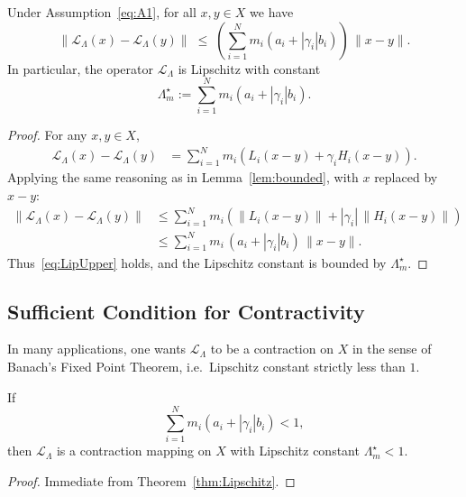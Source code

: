 \documentclass[11pt]{article}
\begin{document}
\begin{theorem}\label{thm:Lipschitz}
Under Assumption~\eqref{eq:A1}, for all $x,y\in X$ we have
\begin{equation}
  \|\mathcal{L}_\Lambda(x) - \mathcal{L}_\Lambda(y)\|
  \;\le\;
  \left(\sum_{i=1}^N m_i (a_i + |\gamma_i| b_i)\right)\,\|x-y\|.
  \label{eq:LipUpper}
\end{equation}
In particular, the operator $\mathcal{L}_\Lambda$ is Lipschitz with constant
\[
  \Lambda_m^\star := \sum_{i=1}^N m_i (a_i + |\gamma_i| b_i).
\]
\end{theorem}

\begin{proof}
For any $x,y\in X$,
\begin{align*}
  \mathcal{L}_\Lambda(x)-\mathcal{L}_\Lambda(y)
  &= \sum_{i=1}^N m_i \left( L_i(x-y) + \gamma_i H_i(x-y) \right).
\end{align*}
Applying the same reasoning as in Lemma~\ref{lem:bounded}, with $x$ replaced by $x-y$:
\begin{align*}
  \|\mathcal{L}_\Lambda(x)-\mathcal{L}_\Lambda(y)\|
  &\le \sum_{i=1}^N m_i \left(\|L_i(x-y)\| + |\gamma_i| \,\|H_i(x-y)\| \right)\\
  &\le \sum_{i=1}^N m_i\,(a_i + |\gamma_i|b_i)\,\|x-y\|.
\end{align*}
Thus~\eqref{eq:LipUpper} holds, and the Lipschitz constant is bounded by $\Lambda_m^\star$.
\end{proof}

\subsection{Sufficient Condition for Contractivity}

In many applications, one wants $\mathcal{L}_\Lambda$ to be a contraction on $X$ in the sense of Banach's Fixed Point Theorem, i.e.\ Lipschitz constant strictly less than $1$.

\begin{corollary}\label{cor:contractive}
If
\begin{equation}
  \sum_{i=1}^N m_i (a_i + |\gamma_i|b_i) < 1,
  \label{eq:contract}
\end{equation}
then $\mathcal{L}_\Lambda$ is a contraction mapping on $X$ with Lipschitz constant
$\Lambda_m^\star < 1$.
\end{corollary}

\begin{proof}
Immediate from Theorem~\ref{thm:Lipschitz}.
\end{proof}
\end{document}
